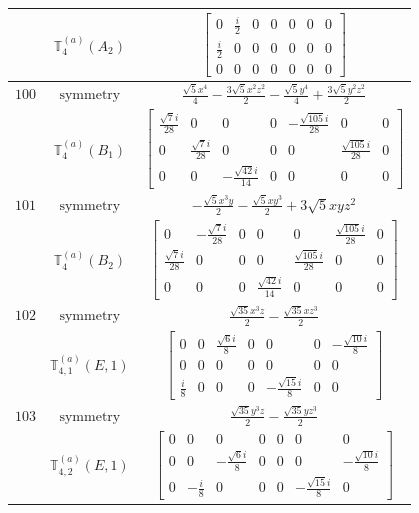 \documentclass[fleqn,8pt,landscape]{jsarticle}
\begin{document}
\begin{longtable}{ccc}
$  $ & $ \mathbb{T}_{4}^{(a)}(A_{2}) $ & $ \begin{bmatrix} 0 & \frac{i}{2} & 0 & 0 & 0 & 0 & 0 \\ \frac{i}{2} & 0 & 0 & 0 & 0 & 0 & 0 \\ 0 & 0 & 0 & 0 & 0 & 0 & 0 \end{bmatrix} $ \\ \hline
$ 100 $ & $ \text{symmetry} $ & $ \frac{\sqrt{5} x^{4}}{4} - \frac{3 \sqrt{5} x^{2} z^{2}}{2} - \frac{\sqrt{5} y^{4}}{4} + \frac{3 \sqrt{5} y^{2} z^{2}}{2} $ \\
$  $ & $ \mathbb{T}_{4}^{(a)}(B_{1}) $ & $ \begin{bmatrix} \frac{\sqrt{7} i}{28} & 0 & 0 & 0 & - \frac{\sqrt{105} i}{28} & 0 & 0 \\ 0 & \frac{\sqrt{7} i}{28} & 0 & 0 & 0 & \frac{\sqrt{105} i}{28} & 0 \\ 0 & 0 & - \frac{\sqrt{42} i}{14} & 0 & 0 & 0 & 0 \end{bmatrix} $ \\ \hline
$ 101 $ & $ \text{symmetry} $ & $ - \frac{\sqrt{5} x^{3} y}{2} - \frac{\sqrt{5} x y^{3}}{2} + 3 \sqrt{5} x y z^{2} $ \\
$  $ & $ \mathbb{T}_{4}^{(a)}(B_{2}) $ & $ \begin{bmatrix} 0 & - \frac{\sqrt{7} i}{28} & 0 & 0 & 0 & \frac{\sqrt{105} i}{28} & 0 \\ \frac{\sqrt{7} i}{28} & 0 & 0 & 0 & \frac{\sqrt{105} i}{28} & 0 & 0 \\ 0 & 0 & 0 & \frac{\sqrt{42} i}{14} & 0 & 0 & 0 \end{bmatrix} $ \\ \hline
$ 102 $ & $ \text{symmetry} $ & $ \frac{\sqrt{35} x^{3} z}{2} - \frac{\sqrt{35} x z^{3}}{2} $ \\
$  $ & $ \mathbb{T}_{4,1}^{(a)}(E,1) $ & $ \begin{bmatrix} 0 & 0 & \frac{\sqrt{6} i}{8} & 0 & 0 & 0 & - \frac{\sqrt{10} i}{8} \\ 0 & 0 & 0 & 0 & 0 & 0 & 0 \\ \frac{i}{8} & 0 & 0 & 0 & - \frac{\sqrt{15} i}{8} & 0 & 0 \end{bmatrix} $ \\ \hline
$ 103 $ & $ \text{symmetry} $ & $ \frac{\sqrt{35} y^{3} z}{2} - \frac{\sqrt{35} y z^{3}}{2} $ \\
$  $ & $ \mathbb{T}_{4,2}^{(a)}(E,1) $ & $ \begin{bmatrix} 0 & 0 & 0 & 0 & 0 & 0 & 0 \\ 0 & 0 & - \frac{\sqrt{6} i}{8} & 0 & 0 & 0 & - \frac{\sqrt{10} i}{8} \\ 0 & - \frac{i}{8} & 0 & 0 & 0 & - \frac{\sqrt{15} i}{8} & 0 \end{bmatrix} $ \\ \hline

\end{longtable}
\end{document}
